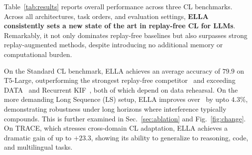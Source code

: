 \documentclass[11pt]{article}
\begin{document}

Table~\ref{tab:results} reports overall performance across three CL benchmarks. Across all architectures, task orders, and evaluation settings, \textbf{ELLA consistently sets a new state of the art in replay-free CL for LLMs}. Remarkably, it not only dominates replay-free baselines but also surpasses strong replay-augmented methods, despite introducing no additional memory or computational burden.

On the Standard CL benchmark, ELLA achieves an average accuracy of $79.9$ on T$5$-Large, outperforming the strongest replay-free competitor~\cite{qiao2024learn} and exceeding DATA~\cite{liao2025data} and Recurrent KIF~\cite{feng2025recurrent}, both of which depend on data rehearsal. On the more demanding Long Sequence (LS) setup, ELLA improves over~\cite{qiao2024learn, du2024unlocking} by upto $4.3\%$, demonstrating robustness under long horizons where interference typically compounds. This is further examined in Sec.~\ref{sec:ablation} and Fig.~\ref{fig:change}. On TRACE, which stresses cross-domain CL adaptation, ELLA achieves a dramatic gain of up to $+23.3$, showing its ability to generalize to reasoning, code, and multilingual tasks.
\end{document}
